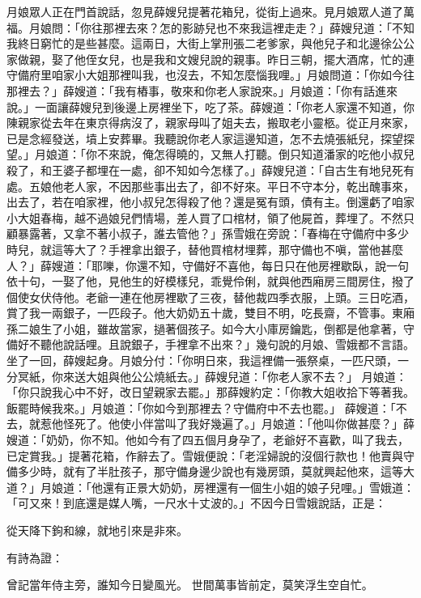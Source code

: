 月娘眾人正在門首說話，忽見薛嫂兒提著花箱兒，從街上過來。見月娘眾人道了萬福。月娘問：「你往那裡去來？怎的影跡兒也不來我這裡走走？」薛嫂兒道：「不知我終日窮忙的是些甚麼。這兩日，大街上掌刑張二老爹家，與他兒子和北邊徐公公家做親，娶了他侄女兒，也是我和文嫂兒說的親事。昨日三朝，擺大酒席，忙的連守備府里咱家小大姐那裡叫我，也沒去，不知怎麼惱我哩。」月娘問道：「你如今往那裡去？」薛嫂道：「我有樁事，敬來和你老人家說來。」月娘道：「你有話進來說。」一面讓薛嫂兒到後邊上房裡坐下，吃了茶。薛嫂道：「你老人家還不知道，你陳親家從去年在東京得病沒了，親家母叫了姐夫去，搬取老小靈柩。從正月來家，已是念經發送，墳上安葬畢。我聽說你老人家這邊知道，怎不去燒張紙兒，探望探望。」月娘道：「你不來說，俺怎得曉的，又無人打聽。倒只知道潘家的吃他小叔兒殺了，和王婆子都埋在一處，卻不知如今怎樣了。」薛嫂兒道：「自古生有地兒死有處。五娘他老人家，不因那些事出去了，卻不好來。平日不守本分，乾出醜事來，出去了，若在咱家裡，他小叔兒怎得殺了他？還是冤有頭，債有主。倒還虧了咱家小大姐春梅，越不過娘兒們情場，差人買了口棺材，領了他屍首，葬埋了。不然只顧暴露著，又拿不著小叔子，誰去管他？」孫雪娥在旁說：「春梅在守備府中多少時兒，就這等大了？手裡拿出銀子，替他買棺材埋葬，那守備也不嗔，當他甚麼人？」薛嫂道：「耶嚛，你還不知，守備好不喜他，每日只在他房裡歇臥，說一句依十句，一娶了他，見他生的好模樣兒，乖覺伶俐，就與他西廂房三間房住，撥了個使女伏侍他。老爺一連在他房裡歇了三夜，替他裁四季衣服，上頭。三日吃酒，賞了我一兩銀子，一匹段子。他大奶奶五十歲，雙目不明，吃長齋，不管事。東廂孫二娘生了小姐，雖故當家，撾著個孩子。如今大小庫房鑰匙，倒都是他拿著，守備好不聽他說話哩。且說銀子，手裡拿不出來？」幾句說的月娘、雪娥都不言語。坐了一回，薛嫂起身。月娘分付：「你明日來，我這裡備一張祭桌，一匹尺頭，一分冥紙，你來送大姐與他公公燒紙去。」薛嫂兒道：「你老人家不去？」 月娘道：「你只說我心中不好，改日望親家去罷。」那薛嫂約定：「你教大姐收拾下等著我。飯罷時候我來。」月娘道：「你如今到那裡去？守備府中不去也罷。」 薛嫂道：「不去，就惹他怪死了。他使小伴當叫了我好幾遍了。」月娘道：「他叫你做甚麼？」薛嫂道：「奶奶，你不知。他如今有了四五個月身孕了，老爺好不喜歡，叫了我去，已定賞我。」提著花箱，作辭去了。雪娥便說：「老淫婦說的沒個行款也！他賣與守備多少時，就有了半肚孩子，那守備身邊少說也有幾房頭，莫就興起他來，這等大道？」月娘道：「他還有正景大奶奶，房裡還有一個生小姐的娘子兒哩。」雪娥道：「可又來！到底還是媒人嘴，一尺水十丈波的。」不因今日雪娥說話，正是：

從天降下鉤和線，就地引來是非來。

有詩為證：

曾記當年侍主旁，誰知今日變風光。
世間萬事皆前定，莫笑浮生空自忙。
